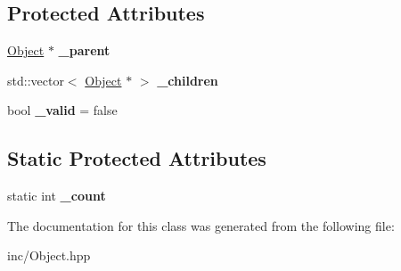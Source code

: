 \subsection*{Protected Attributes}
\begin{DoxyCompactItemize}
\item 
\hypertarget{class_aspen_1_1_object_1_1_object_a3cd9bdc4ee7d3b1ad7ad5a3fcffef228}{\hyperlink{class_aspen_1_1_object_1_1_object}{Object} $\ast$ {\bfseries \-\_\-parent}}\label{class_aspen_1_1_object_1_1_object_a3cd9bdc4ee7d3b1ad7ad5a3fcffef228}

\item 
\hypertarget{class_aspen_1_1_object_1_1_object_a0ad096111db6a0a09fdd5e113d066866}{std\-::vector$<$ \hyperlink{class_aspen_1_1_object_1_1_object}{Object} $\ast$ $>$ {\bfseries \-\_\-children}}\label{class_aspen_1_1_object_1_1_object_a0ad096111db6a0a09fdd5e113d066866}

\item 
\hypertarget{class_aspen_1_1_object_1_1_object_a758956ae85bfe1316609888657092bd5}{bool {\bfseries \-\_\-valid} = false}\label{class_aspen_1_1_object_1_1_object_a758956ae85bfe1316609888657092bd5}

\end{DoxyCompactItemize}
\subsection*{Static Protected Attributes}
\begin{DoxyCompactItemize}
\item 
\hypertarget{class_aspen_1_1_object_1_1_object_a16b58bad3a22150f56ecc37efd19081e}{static int {\bfseries \-\_\-count}}\label{class_aspen_1_1_object_1_1_object_a16b58bad3a22150f56ecc37efd19081e}

\end{DoxyCompactItemize}


The documentation for this class was generated from the following file\-:\begin{DoxyCompactItemize}
\item 
inc/Object.\-hpp\end{DoxyCompactItemize}
